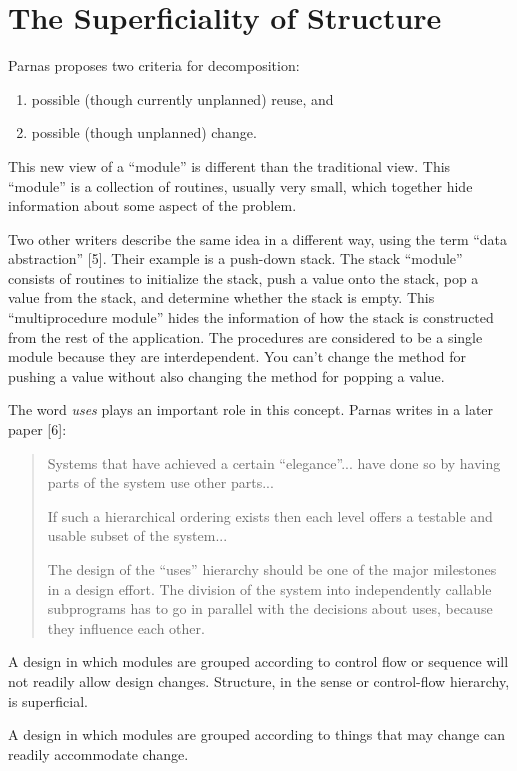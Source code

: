 \section*{The Superficiality of Structure}

Parnas proposes two criteria for decomposition:

\begin{enumerate}
\item possible (though currently unplanned) reuse, and
\item possible (though unplanned) change.
\end{enumerate}
This new view of a {}``module'' is different than the traditional
view. This {}``module'' is a collection of routines, usually very
small, which together hide information about some aspect of the problem. 

Two other writers describe the same idea in a different way, using
the term {}``data abstraction'' {[}5{]}. Their example is a push-down
stack. The stack {}``module'' consists of routines to initialize
the stack, push a value onto the stack, pop a value from the stack,
and determine whether the stack is empty. This {}``multiprocedure
module'' hides the information of how the stack is constructed from
the rest of the application. The procedures are considered to be a
single module because they are interdependent. You can't change the
method for pushing a value without also changing the method for popping
a value.

The word \emph{uses} plays an important role in this concept. Parnas
writes in a later paper {[}6{]}:

\begin{quote}
Systems that have achieved a certain {}``elegance''... have done
so by having parts of the system use other parts...

If such a hierarchical ordering exists then each level offers a testable
and usable subset of the system...

The design of the {}``uses'' hierarchy should be one of the major
milestones in a design effort. The division of the system into independently
callable subprograms has to go in parallel with the decisions about
uses, because they influence each other.
\end{quote}
A design in which modules are grouped according to control flow or
sequence will not readily allow design changes. Structure, in the
sense or control-flow hierarchy, is superficial.

A design in which modules are grouped according to things that may
change can readily accommodate change.


